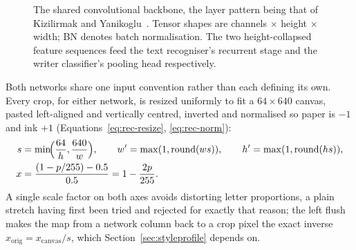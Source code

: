 \begin{figure}[h]
\centering
{}
\caption{The shared convolutional backbone, the layer pattern being that of Kizilirmak and Yanikoglu~\cite[p.~9]{kizilirmak2023}. Tensor shapes are channels $\times$ height $\times$ width; BN denotes batch normalisation. The two height-collapsed feature sequences feed the text recogniser's recurrent stage and the writer classifier's pooling head respectively.}
\label{fig:rec-arch}
\end{figure}

Both networks share one input convention rather than each defining its own. Every crop, for either network, is resized uniformly to fit a $64\times640$ canvas, pasted left-aligned and vertically centred, inverted and normalised so paper is $-1$ and ink $+1$ (Equations~\ref{eq:rec-resize}, \ref{eq:rec-norm}):
\begin{align}
s&=\min\!\Bigl(\frac{64}{h},\frac{640}{w}\Bigr),\qquad w'=\max(1,\mathrm{round}(ws)),\qquad h'=\max(1,\mathrm{round}(hs)),\label{eq:rec-resize}\\
x&=\frac{(1-p/255)-0.5}{0.5}=1-\frac{2p}{255}.\label{eq:rec-norm}
\end{align}
A single scale factor on both axes avoids distorting letter proportions, a plain stretch having first been tried and rejected for exactly that reason; the left flush makes the map from a network column back to a crop pixel the exact inverse $x_{\mathrm{orig}}=x_{\mathrm{canvas}}/s$, which Section~\ref{sec:styleprofile} depends on.

